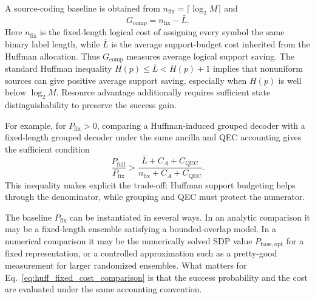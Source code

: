 A source-coding baseline is obtained from $n_{\mathrm{fix}}=\lceil\log_2M\rceil$ and
\begin{equation}
    G_{\mathrm{comp}}=n_{\mathrm{fix}}-\bar L.
\end{equation}
Here $n_{\mathrm{fix}}$ is the fixed-length logical cost of assigning every symbol the same binary label length, while $\bar L$ is the average support-budget cost inherited from the Huffman allocation. Thus $G_{\mathrm{comp}}$ measures average logical support saving. The standard Huffman inequality $H(p)\le \bar L < H(p)+1$ implies that nonuniform sources can give positive average support saving, especially when $H(p)$ is well below $\log_2M$. Resource advantage additionally requires sufficient state distinguishability to preserve the success gain.

For example, for \(P_{\mathrm{fix}}>0\), comparing a Huffman-induced grouped decoder with a fixed-length grouped decoder under the same ancilla and QEC accounting gives the sufficient condition
\begin{equation}
    \frac{P_{\mathrm{full}}}{P_{\mathrm{fix}}}
    >
    \frac{\bar L+C_A+C_{\mathrm{QEC}}}
    {n_{\mathrm{fix}}+C_A+C_{\mathrm{QEC}}}.
    \label{eq:huff_fixed_cost_comparison}
\end{equation}
This inequality makes explicit the trade-off: Huffman support budgeting helps through the denominator, while grouping and QEC must protect the numerator.

The baseline $P_{\mathrm{fix}}$ can be instantiated in several ways. In an analytic comparison it may be a fixed-length ensemble satisfying a bounded-overlap model. In a numerical comparison it may be the numerically solved SDP value $P_{\mathrm{base,opt}}$ for a fixed representation, or a controlled approximation such as a pretty-good measurement for larger randomized ensembles. What matters for Eq.~\eqref{eq:huff_fixed_cost_comparison} is that the success probability and the cost are evaluated under the same accounting convention.

